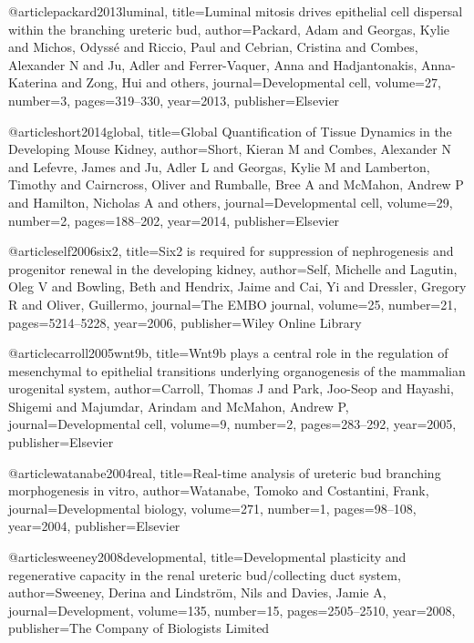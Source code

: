 @article{packard2013luminal,
  title={Luminal mitosis drives epithelial cell dispersal within the branching ureteric bud},
  author={Packard, Adam and Georgas, Kylie and Michos, Odyss{\'e} and Riccio, Paul and Cebrian, Cristina and Combes, Alexander N and Ju, Adler and Ferrer-Vaquer, Anna and Hadjantonakis, Anna-Katerina and Zong, Hui and others},
  journal={Developmental cell},
  volume={27},
  number={3},
  pages={319--330},
  year={2013},
  publisher={Elsevier}
}

@article{short2014global,
  title={Global Quantification of Tissue Dynamics in the Developing Mouse Kidney},
  author={Short, Kieran M and Combes, Alexander N and Lefevre, James and Ju, Adler L and Georgas, Kylie M and Lamberton, Timothy and Cairncross, Oliver and Rumballe, Bree A and McMahon, Andrew P and Hamilton, Nicholas A and others},
  journal={Developmental cell},
  volume={29},
  number={2},
  pages={188--202},
  year={2014},
  publisher={Elsevier}
}

@article{self2006six2,
  title={Six2 is required for suppression of nephrogenesis and progenitor renewal in the developing kidney},
  author={Self, Michelle and Lagutin, Oleg V and Bowling, Beth and Hendrix, Jaime and Cai, Yi and Dressler, Gregory R and Oliver, Guillermo},
  journal={The EMBO journal},
  volume={25},
  number={21},
  pages={5214--5228},
  year={2006},
  publisher={Wiley Online Library}
}

@article{carroll2005wnt9b,
  title={Wnt9b plays a central role in the regulation of mesenchymal to epithelial transitions underlying organogenesis of the mammalian urogenital system},
  author={Carroll, Thomas J and Park, Joo-Seop and Hayashi, Shigemi and Majumdar, Arindam and McMahon, Andrew P},
  journal={Developmental cell},
  volume={9},
  number={2},
  pages={283--292},
  year={2005},
  publisher={Elsevier}
}

@article{watanabe2004real,
  title={Real-time analysis of ureteric bud branching morphogenesis in vitro},
  author={Watanabe, Tomoko and Costantini, Frank},
  journal={Developmental biology},
  volume={271},
  number={1},
  pages={98--108},
  year={2004},
  publisher={Elsevier}
}

@article{sweeney2008developmental,
  title={Developmental plasticity and regenerative capacity in the renal ureteric bud/collecting duct system},
  author={Sweeney, Derina and Lindstr{\"o}m, Nils and Davies, Jamie A},
  journal={Development},
  volume={135},
  number={15},
  pages={2505--2510},
  year={2008},
  publisher={The Company of Biologists Limited}
}